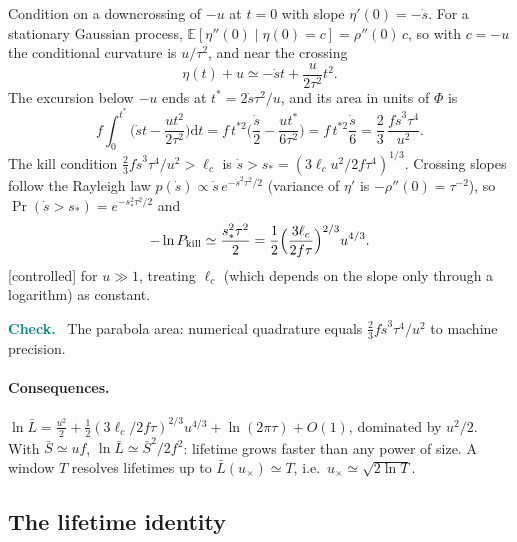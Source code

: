 \documentclass[11pt]{article}
\newcommand{\E}{\mathbb E}
\newcommand{\Sb}{\bar S}
\newcommand{\dd}{\mathrm d}
\newcommand{\controlled}{\textsf{\small[controlled]}}
\newenvironment{verify}{\par\medskip\noindent\textcolor{teal}{\textbf{Check.}}\ }{\par\medskip}
\begin{document}
Condition on a downcrossing of $-u$ at $t=0$ with slope $\eta'(0)=-\dot s$.  For a stationary Gaussian process,
$\E[\eta''(0)\mid\eta(0)=c]=\rho''(0)\,c$, so with $c=-u$ the conditional curvature is $u/\tau^2$, and near the crossing
\begin{equation}
\eta(t)+u\simeq-\dot st+\frac{u}{2\tau^2}t^2 .
\end{equation}
The excursion below $-u$ ends at $t^*=2\dot s\tau^2/u$, and its area in units of $\Phi$ is
\begin{equation}
f\int_0^{t^*}\Big(\dot st-\frac{u t^2}{2\tau^2}\Big)\dd t=f\,t^{*2}\Big(\frac{\dot s}2-\frac{ut^*}{6\tau^2}\Big)=f\,t^{*2}\frac{\dot s}{6}=\frac23\,\frac{f\dot s^3\tau^4}{u^2}.
\end{equation}
The kill condition $\frac23f\dot s^3\tau^4/u^2>\ell_c$ is $\dot s>s_*=(3\ell_cu^2/2f\tau^4)^{1/3}$.  Crossing slopes follow the Rayleigh law
$p(\dot s)\propto\dot s\,e^{-\dot s^2\tau^2/2}$ (variance of $\eta'$ is $-\rho''(0)=\tau^{-2}$), so $\Pr(\dot s>s_*)=e^{-s_*^2\tau^2/2}$ and
\begin{equation}
-\ln P_{\rm kill}\simeq\frac{s_*^2\tau^2}{2}=\frac12\Big(\frac{3\ell_c}{2f\tau}\Big)^{2/3}u^{4/3}.
\end{equation}
\controlled{} for $u\gg1$, treating $\ell_c$ (which depends on the slope only through a logarithm) as constant.
\begin{verify}
The parabola area: numerical quadrature equals $\tfrac23f\dot s^3\tau^4/u^2$ to machine precision.
\end{verify}

\paragraph{Consequences.}  $\ln\bar L=\tfrac{u^2}2+\tfrac12(3\ell_c/2f\tau)^{2/3}u^{4/3}+\ln(2\pi\tau)+O(1)$, dominated by $u^2/2$.  With
$\Sb\simeq uf$, $\ln\bar L\simeq\Sb^2/2f^2$: lifetime grows faster than any power of size.  A window $T$ resolves lifetimes up to
$\bar L(u_\times)\simeq T$, i.e.\ $u_\times\simeq\sqrt{2\ln T}$.

\subsection{The lifetime identity}
\label{sec:lifetimeidentity}
\end{document}
